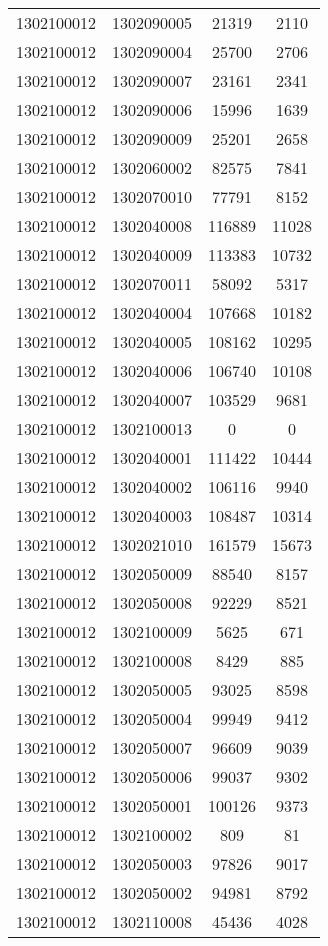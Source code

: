 \begin{longtable}[h]{llcc}
		1302100012 & 1302090005 & 21319 & 2110\\
		1302100012 & 1302090004 & 25700 & 2706\\
		1302100012 & 1302090007 & 23161 & 2341\\
		1302100012 & 1302090006 & 15996 & 1639\\
		1302100012 & 1302090009 & 25201 & 2658\\
		1302100012 & 1302060002 & 82575 & 7841\\
		1302100012 & 1302070010 & 77791 & 8152\\
		1302100012 & 1302040008 & 116889 & 11028\\
		1302100012 & 1302040009 & 113383 & 10732\\
		1302100012 & 1302070011 & 58092 & 5317\\
		1302100012 & 1302040004 & 107668 & 10182\\
		1302100012 & 1302040005 & 108162 & 10295\\
		1302100012 & 1302040006 & 106740 & 10108\\
		1302100012 & 1302040007 & 103529 & 9681\\
		1302100012 & 1302100013 & 0 & 0\\
		1302100012 & 1302040001 & 111422 & 10444\\
		1302100012 & 1302040002 & 106116 & 9940\\
		1302100012 & 1302040003 & 108487 & 10314\\
		1302100012 & 1302021010 & 161579 & 15673\\
		1302100012 & 1302050009 & 88540 & 8157\\
		1302100012 & 1302050008 & 92229 & 8521\\
		1302100012 & 1302100009 & 5625 & 671\\
		1302100012 & 1302100008 & 8429 & 885\\
		1302100012 & 1302050005 & 93025 & 8598\\
		1302100012 & 1302050004 & 99949 & 9412\\
		1302100012 & 1302050007 & 96609 & 9039\\
		1302100012 & 1302050006 & 99037 & 9302\\
		1302100012 & 1302050001 & 100126 & 9373\\
		1302100012 & 1302100002 & 809 & 81\\
		1302100012 & 1302050003 & 97826 & 9017\\
		1302100012 & 1302050002 & 94981 & 8792\\
		1302100012 & 1302110008 & 45436 & 4028\\

\end{longtable}
